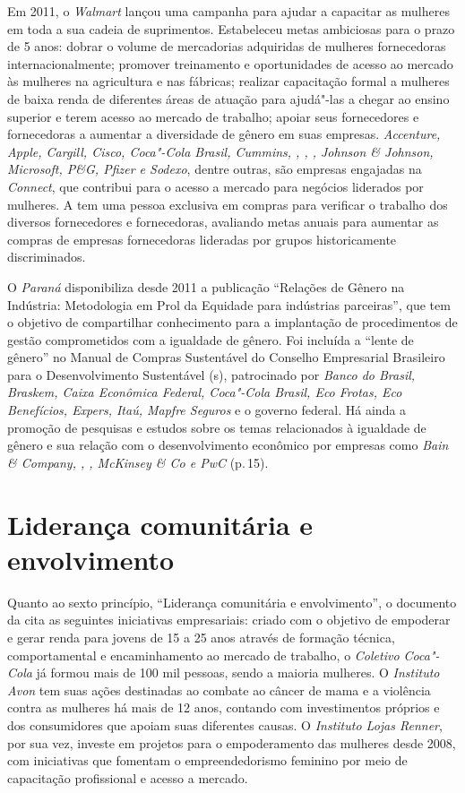 Em 2011, o \emph{Walmart} lançou uma campanha para ajudar a capacitar as
mulheres em toda a sua cadeia de suprimentos. Estabeleceu metas
ambiciosas para o prazo de 5 anos: dobrar o volume de mercadorias
adquiridas de mulheres fornecedoras internacionalmente; promover
treinamento e oportunidades de acesso ao mercado às mulheres na
agricultura e nas fábricas; realizar
capacitação formal a mulheres de baixa renda de diferentes áreas de
atuação para ajudá"-las a chegar ao ensino superior e terem acesso ao
mercado de trabalho; apoiar seus fornecedores e fornecedoras a aumentar
a diversidade de gênero em suas empresas. \emph{Accenture, Apple,
Cargill, Cisco, Coca"-Cola Brasil, Cummins, , , , Johnson \&
Johnson, Microsoft, P\&G, Pfizer e Sodexo}, dentre outras, são empresas
engajadas na \emph{ Connect}, que contribui para o acesso a
mercado para negócios liderados por mulheres. A \emph{} tem uma
pessoa exclusiva em compras para verificar o trabalho dos diversos
fornecedores e fornecedoras, avaliando metas anuais para aumentar as
compras de empresas fornecedoras lideradas por grupos historicamente
discriminados.

O \emph{ Paraná} disponibiliza desde 2011 a publicação ``Relações de
Gênero na Indústria: Metodologia  em Prol da Equidade para
indústrias parceiras'', que tem o objetivo de compartilhar conhecimento
para a implantação de procedimentos de gestão comprometidos com a
igualdade de gênero. Foi incluída a ``lente de gênero'' no Manual de
Compras Sustentável do Conselho Empresarial Brasileiro para o
Desenvolvimento Sustentável (s), patrocinado por \emph{Banco do
Brasil, Braskem, Caixa Econômica Federal, Coca"-Cola Brasil, Eco Frotas,
Eco Benefícios, Expers, Itaú, Mapfre Seguros} e o governo federal. Há
ainda a promoção de pesquisas e estudos sobre os temas relacionados à
igualdade de gênero e sua relação com o desenvolvimento econômico por
empresas como \emph{Bain \& Company, , , McKinsey \& Co e PwC}
(p.\,15).

\section{Liderança comunitária e envolvimento}

Quanto ao sexto princípio, ``Liderança comunitária e envolvimento'', o
documento da  cita as seguintes iniciativas empresariais: criado com
o objetivo de empoderar e gerar renda para jovens de 15 a 25 anos
através de formação técnica, comportamental e encaminhamento ao mercado
de trabalho, o \emph{Coletivo Coca"-Cola} já formou mais de 100 mil
pessoas, sendo a maioria mulheres. O \emph{Instituto Avon} tem suas
ações destinadas ao combate ao câncer de mama e a violência contra as
mulheres há mais de 12 anos, contando com investimentos próprios e dos
consumidores que apoiam suas diferentes causas. O \emph{Instituto Lojas
Renner}, por sua vez, investe em projetos para o empoderamento das
mulheres desde 2008, com iniciativas que fomentam o empreendedorismo
feminino por meio de capacitação profissional e acesso a mercado.

